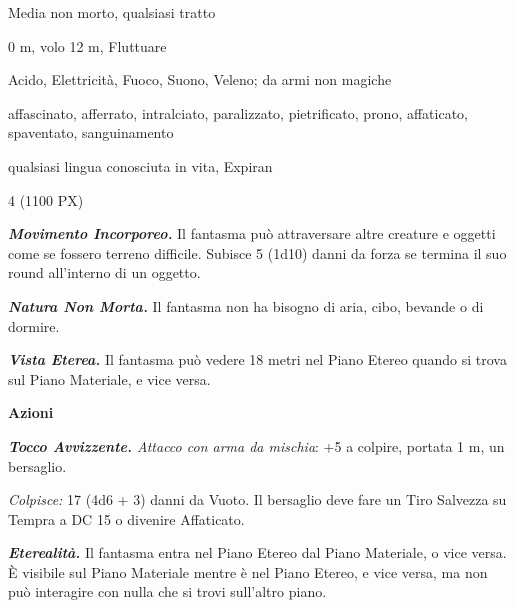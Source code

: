 \begin{multicols}{2}
{%

\begin{description}[noitemsep, topsep=0pt, parsep=0pt, partopsep=0pt, itemsep=1pt, leftmargin=2.35cm,  labelwidth=2.2cm, itemindent=0cm, listparindent=0pt] %
\setlength{\baselineskip}{10pt}
\item[\textbf{Taglia/Tipo}] Media non morto, qualsiasi tratto
\item[\textbf{Caratt.}] 
\item[\textbf{Punti Ferita}] 
\item[\textbf{Movimento}] 0 m, volo 12 m, Fluttuare
\item[\textbf{Tiri Salvez.}] 
\item[\textbf{Res. Danni}] Acido, Elettricità, Fuoco, Suono, Veleno; da armi non magiche
\item[\textbf{Immunità}] affascinato, afferrato, intralciato, paralizzato, pietrificato, prono, affaticato, spaventato, sanguinamento
\item[\textbf{Sensi}] 
\item[\textbf{Linguaggi}] qualsiasi lingua conosciuta in vita, Expiran
\item[\textbf{Sfida}] 4 (1100 PX)
\end{description}
\smallskip

\emph{\textbf{Movimento Incorporeo.}} Il fantasma può attraversare altre creature e oggetti come se fossero terreno difficile. Subisce 5 (1d10) danni da forza se termina il suo round all'interno di un oggetto.

\emph{\textbf{Natura Non Morta.}} Il fantasma non ha bisogno di aria, cibo, bevande o di dormire.

\emph{\textbf{Vista Eterea.}} Il fantasma può vedere 18 metri nel Piano Etereo quando si trova sul Piano Materiale, e vice versa.

\textbf{Azioni}

\emph{\textbf{Tocco Avvizzente.} Attacco con arma da mischia}: +5 a colpire, portata 1 m, un bersaglio.

\emph{Colpisce:} 17 (4d6 + 3) danni da Vuoto. Il bersaglio deve fare un Tiro Salvezza su Tempra a DC 15 o divenire Affaticato.

\emph{\textbf{Eterealità.}} Il fantasma entra nel Piano Etereo dal Piano Materiale, o vice versa. È visibile sul Piano Materiale mentre è nel Piano Etereo, e vice versa, ma non può interagire con nulla che si trovi sull'altro piano.

}
\end{multicols}

